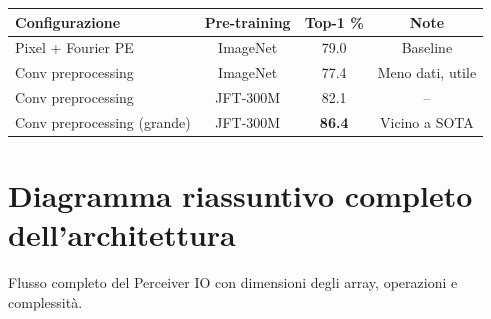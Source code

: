 \documentclass[12pt,a4paper]{article}
\begin{document}
\begin{center}
\begin{tabular}{lccc}
\toprule
\textbf{Configurazione} & \textbf{Pre-training} & \textbf{Top-1 \%} & \textbf{Note} \\
\midrule
Pixel + Fourier PE & ImageNet & 79.0 & Baseline \\
Conv preprocessing & ImageNet & 77.4 & Meno dati, utile \\
Conv preprocessing & JFT-300M & 82.1 & -- \\
Conv preprocessing (grande) & JFT-300M & \textbf{86.4} & Vicino a SOTA \\
\bottomrule
\end{tabular}
\end{center}


\section{Diagramma riassuntivo completo dell'architettura}

Flusso completo del Perceiver IO con dimensioni degli array, operazioni e complessit\`a.
\end{document}
